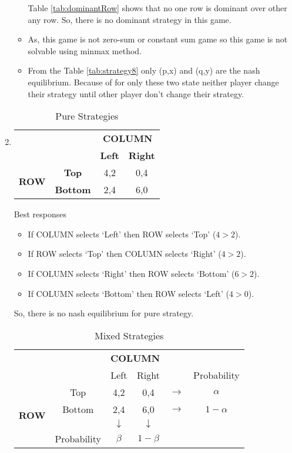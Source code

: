 \documentclass[a4paper,12pt]{article}
\begin{document}
\begin{enumerate}
\begin{itemize}
Table \ref{tab:dominantRow} shows that no one row is dominant over other any row. So, there is no dominant strategy in this game.
\item
As, this game is not zero-sum or constant sum game so this game is not solvable using minmax method.
\item From the Table \ref{tab:strategy8} only (p,x) and (q,y) are the nash equilibrium. Because of for only these two state neither player change their strategy until other player don't change their strategy.
\end{itemize}
\item%
 \begin{table}[H]
 \centering
\begin{tabular}{@{}cccc@{}}
\toprule
\multicolumn{2}{c}{} & \multicolumn{2}{c}{\bfseries COLUMN}\\
\multicolumn{2}{c}{} & \textbf{Left} & \textbf{Right}\\
\multirow{2}{*}{\bfseries ROW} & \textbf{Top} & 4,2 & 0,4\\
 & \textbf{Bottom} & 2,4 & 6,0\\
 \bottomrule
\end{tabular}
\caption{Pure Strategies}
\end{table}

Best responses
\begin{itemize}
\item If COLUMN selects `Left' then ROW selects `Top' ($4>2$).
\item If ROW selects `Top' then COLUMN selects `Right' ($4>2$).
\item If COLUMN selects `Right' then ROW selects `Bottom' ($6>2$).
\item If COLUMN selects `Bottom' then ROW selects `Left' ($4>0$).
\end{itemize}
So, there is no nash equilibrium for pure strategy.

 \begin{table}[H]
 \centering
\begin{tabular}{@{}cccccc@{}}
\toprule
\multicolumn{2}{c}{} & \multicolumn{2}{c}{\bfseries COLUMN}\\
\multicolumn{2}{c}{} & Left & Right & & Probability\\
\multirow{4}{*}{\bfseries ROW} & Top & 4,2 & 0,4 & $\rightarrow$ & $\alpha$\\
 & Bottom & 2,4 & 6,0 & $\rightarrow$ & $1-\alpha$\\
 & & $\downarrow$ & $\downarrow$ & \\
 & Probability & $\beta$ & $1-\beta$ &\\
 \bottomrule
\end{tabular}
\caption{Mixed Strategies}
\end{table}


\end{enumerate}
\end{document}
